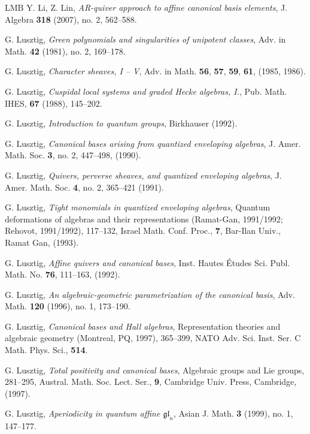 \documentclass[a4paper,10pt]{amsart}
\numberwithin{equation}{section}
\begin{document}
{\begin{thebibliography}{LMB}
Y. Li, Z. Lin, \emph{AR-quiver approach to affine canonical basis elements},
J. Algebra \textbf{318} (2007), no. 2, 562--588. 

G. Lusztig, \emph{Green polynomials and singularities of unipotent classes},  Adv. in Math. \textbf{42}  (1981), no. 2, 169--178. 

G. Lusztig, \emph{Character sheaves, I -- V}, Adv. in Math. \textbf{56}, \textbf{57}, \textbf{59}, \textbf{61}, (1985, 1986).

G. Lusztig, \emph{Cuspidal local systems and graded Hecke algebras, I.}, Pub. Math. IHES, \textbf{67} (1988), 145--202. 

G. Lusztig, \emph{Introduction to quantum groups}, Birkhauser (1992).

 G. Lusztig, \emph{Canonical bases arising from quantized enveloping algebras}, J. Amer. Math. Soc. \textbf{3}, no. 2, 447--498, (1990).

G. Lusztig, \emph{Quivers, perverse sheaves, and quantized enveloping algebras}, J. Amer. Math. Soc. \textbf{4}, no. 2, 365--421 (1991).

G. Lusztig, \emph{Tight monomials in quantized enveloping algebras}, Quantum deformations of algebras and their representations (Ramat-Gan, 1991/1992; Rehovot, 1991/1992),  117--132,
Israel Math. Conf. Proc., \textbf{7}, Bar-Ilan Univ., Ramat Gan, (1993). 

G. Lusztig, \emph{Affine quivers and canonical bases}, Inst. Hautes \'Etudes Sci. Publ. Math. No. \textbf{76}, 111--163, (1992).

G. Lusztig, \emph{An algebraic-geometric parametrization of the canonical basis},  Adv. Math. \textbf{120}  (1996),  no. 1, 173--190. 

G. Lusztig, \emph{Canonical bases and Hall algebras},  Representation theories and algebraic geometry (Montreal, PQ, 1997),  365--399, NATO Adv. Sci. Inst. Ser. C Math. Phys. Sci., \textbf{514}.

G. Lusztig, \emph{Total positivity and canonical bases},  Algebraic groups and Lie groups,  281--295, Austral. Math. Soc. Lect. Ser., \textbf{9}, Cambridge Univ. Press, Cambridge, (1997).

G. Lusztig, \emph{Aperiodicity in quantum affine $\mathfrak{gl}_n$}, Asian J. Math. \textbf{3} (1999), no. 1, 147--177. 


\end{thebibliography}}
\end{document}
